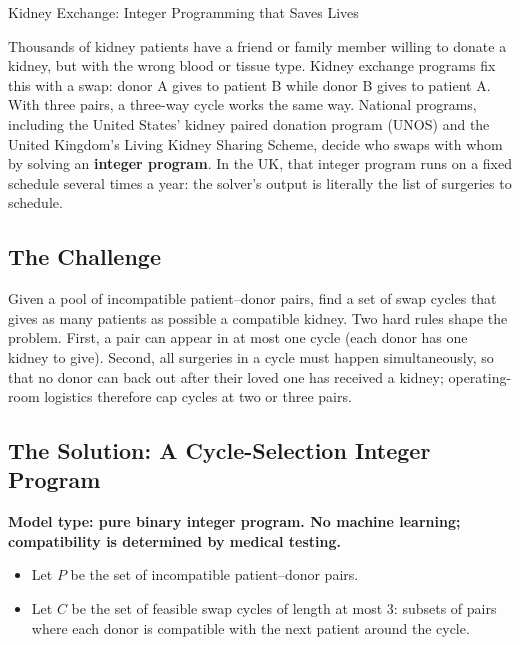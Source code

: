 \begin{casestudybox}{Kidney Exchange: Integer Programming that Saves Lives}

Thousands of kidney patients have a friend or family member willing to donate a kidney, but with the wrong blood or tissue type.  Kidney exchange programs fix this with a swap: donor A gives to patient B while donor B gives to patient A.  With three pairs, a three-way cycle works the same way.  National programs, including the United States' kidney paired donation program (UNOS) and the United Kingdom's Living Kidney Sharing Scheme, decide who swaps with whom by solving an \textbf{integer program}.  In the UK, that integer program runs on a fixed schedule several times a year: the solver's output is literally the list of surgeries to schedule.

\subsection*{The Challenge}
Given a pool of incompatible patient--donor pairs, find a set of swap cycles that gives as many patients as possible a compatible kidney.  Two hard rules shape the problem.  First, a pair can appear in at most one cycle (each donor has one kidney to give).  Second, all surgeries in a cycle must happen simultaneously, so that no donor can back out after their loved one has received a kidney; operating-room logistics therefore cap cycles at two or three pairs.

\subsection*{The Solution: A Cycle-Selection Integer Program}
\textbf{Model type: pure binary integer program.  No machine learning; compatibility is determined by medical testing.}

\begin{itemize}
\item Let $P$ be the set of incompatible patient--donor pairs.
\item Let $C$ be the set of feasible swap cycles of length at most 3: subsets of pairs where each donor is compatible with the next patient around the cycle.
\end{itemize}


\end{casestudybox}
